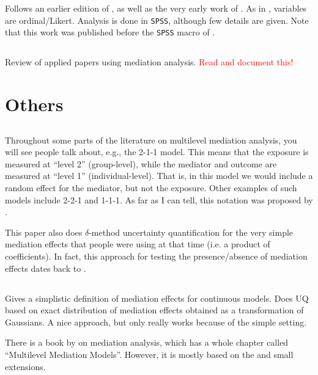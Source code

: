 \documentclass{article}
\begin{document}
Follows an earlier edition of \citet{Mac17}, as well as the very early work of \citet{Bar86}. As in \citet{Ara21}, variables are ordinal/Likert. Analysis is done in \texttt{SPSS}, although few details are given. Note that this work was published before the \texttt{SPSS} macro of \citet{Roc19}.

\subsection{\citet{Rij21}}

Review of applied papers using mediation analysis. \textcolor{red}{Read and document this!}


\section{Others}
\label{sec:other}

\subsection{\citet{Kru01}}

Throughout some parts of the literature on multilevel mediation analysis, you will see people talk about, e.g., the 2-1-1 model. This means that the exposure is measured at ``level 2'' (group-level), while the mediator and outcome are measured at ``level 1'' (individual-level). That is, in this model we would include a random effect for the mediator, but not the exposure. Other examples of such models include 2-2-1 and 1-1-1. As far as I can tell, this notation was proposed by \citet{Kru01}.

This paper also does $\delta$-method uncertainty quantification for the very simple mediation effects that people were using at that time (i.e. a product of coefficients). In fact, this approach for testing the presence/absence of mediation effects dates back to \citet{Sob82}.

\subsection{\citet{Ken03}}

Gives a simplistic definition of mediation effects for continuous models. Does UQ based on exact distribution of mediation effects obtained as a transformation of Gaussians. A nice approach, but only really works because of the simple setting.

There is a book by \citet{Mac17} on mediation analysis, which has a whole chapter called ``Multilevel Mediation Models''. However, it is mostly based on the \citet{Ken03} and small extensions. 
\end{document}
